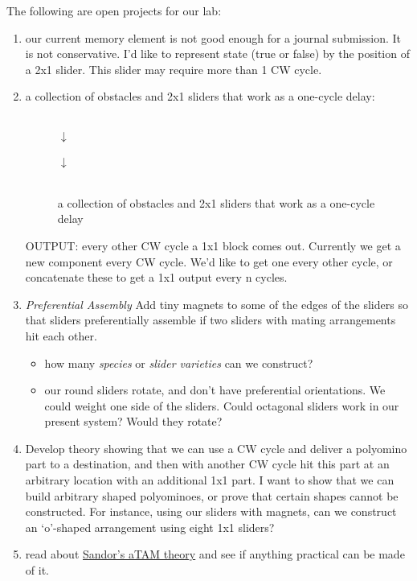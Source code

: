 \documentclass[letterpaper, 10 pt, conference]{ieeeconf}
\begin{document}
The following are open projects for our lab:

\begin{enumerate}
\item our current memory element is not good enough for a journal submission. It is not conservative.  I'd like to represent state (true or false) by the position of a 2x1 slider.  This slider may require more than 1 CW cycle.

\item a collection of obstacles and 2x1 sliders that work as a one-cycle delay:\\
\begin{figure}
\begin{centering}
 \\
$\downarrow$\\ 
\\
$\downarrow$\\ 
   \\
\end{centering}
\caption{
\label{fig:onccycledelay}
 a collection of obstacles and 2x1 sliders that work as a one-cycle delay }
\end{figure}

   
OUTPUT:  every other CW cycle a 1x1 block comes out.  Currently we get a new component every CW cycle.  We'd like to get one every other cycle, or concatenate these to get a 1x1 output every n cycles.

\item \emph{Preferential Assembly}
  Add tiny magnets to some of the edges of the sliders so that sliders preferentially assemble if two sliders with mating arrangements hit each other. 
  \begin{itemize}
  	\item how many \emph{species} or \emph{slider varieties} can we construct?
	\item our round sliders rotate, and don't have preferential orientations.  We could weight one side of the sliders.   Could octagonal sliders work in our present system?  Would they rotate?
	\end{itemize} 
\item Develop theory showing that we can use a CW cycle and deliver a polyomino part to a destination, and then with another CW cycle hit this part at an arbitrary location with an additional 1x1 part.  I want to show that we can build arbitrary shaped polyominoes, or prove that certain shapes cannot be constructed. For instance, using our sliders with magnets, can we construct an `o'-shaped arrangement using eight 1x1 sliders?
\item read about \href{http://arxiv.org/abs/1408.3351}{Sandor's aTAM theory} and see if anything practical can be made of it.
\end{enumerate}


 


 
 
\end{document}
